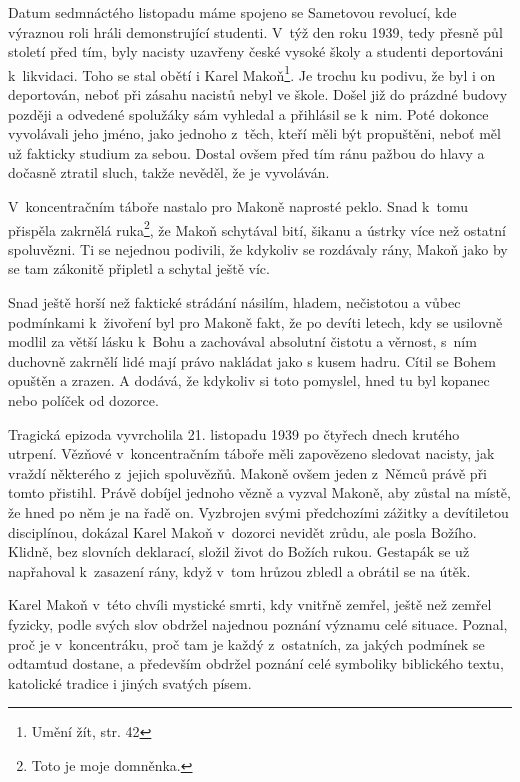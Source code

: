 Datum sedmnáctého listopadu máme spojeno se Sametovou revolucí, kde výraznou
roli hráli demonstrující studenti. V~týž den roku 1939, tedy
přesně půl století před tím, byly nacisty uzavřeny české vysoké školy a studenti
deportováni k~likvidaci. Toho se stal obětí i Karel Makoň\footnote{Umění žít,
str. 42}. Je trochu ku podivu,
že byl i on deportován, neboť při zásahu nacistů nebyl ve škole. Došel již do
prázdné budovy později a odvedené spolužáky sám vyhledal a přihlásil se k~nim.
Poté dokonce vyvolávali jeho jméno, jako jednoho z~těch, kteří měli být
propuštěni, neboť měl už fakticky studium za sebou. Dostal ovšem před tím ránu
pažbou do hlavy a dočasně ztratil sluch, takže nevěděl, že je
vyvoláván.

V~koncentračním táboře nastalo pro Makoně naprosté peklo. Snad k~tomu přispěla
zakrnělá ruka\footnote{Toto je moje domněnka.}, že Makoň schytával bití,
šikanu a ústrky více než ostatní spoluvězni. Ti se nejednou podivili, že
kdykoliv se rozdávaly rány, Makoň jako by se tam zákonitě připletl a schytal
ještě víc.

Snad ještě horší než faktické strádání násilím, hladem, nečistotou a vůbec
podmínkami k~živoření byl pro Makoně fakt, že po devíti letech,
kdy se usilovně modlil za větší lásku k~Bohu a zachovával absolutní čistotu a
věrnost, s~ním duchovně zakrnělí lidé mají právo nakládat jako s kusem hadru.
Cítil se Bohem opuštěn a zrazen. A dodává, že kdykoliv si toto pomyslel, hned tu
byl kopanec nebo políček od dozorce.

Tragická epizoda vyvrcholila 21. listopadu 1939 po čtyřech dnech krutého utrpení. Vězňové
v~koncentračním táboře měli zapovězeno sledovat nacisty, jak vraždí některého
z~jejich spoluvězňů. Makoně ovšem jeden z~Němců právě při tomto přistihl. Právě
dobíjel jednoho vězně a vyzval Makoně, aby zůstal na místě, že hned po něm je na
řadě on. Vyzbrojen svými předchozími zážitky a devítiletou disciplínou, dokázal
Karel Makoň v~dozorci nevidět zrůdu, ale posla Božího. Klidně, bez slovních deklarací,
složil život do Božích rukou. Gestapák se už napřahoval k~zasazení rány, když
v~tom hrůzou zbledl a obrátil se na útěk.

Karel Makoň v~této chvíli mystické smrti, kdy vnitřně zemřel, ještě než zemřel
fyzicky, podle svých slov obdržel najednou poznání významu celé situace. Poznal,
proč je v~koncentráku, proč tam je každý z~ostatních, za jakých podmínek se
odtamtud dostane, a především obdržel poznání celé symboliky biblického textu,
katolické tradice i jiných svatých písem.

